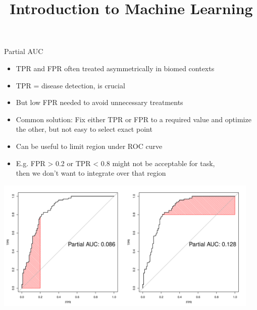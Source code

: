 




\newcommand{\titlefigure}{figure/eval_mclass_roc_sp_13}
\newcommand{\learninggoals}{
\item Understand pAUC 
\item Understand multi-class AUC
}


\title{Introduction to Machine Learning}
\date{}



\sloppy



\begin{vbframe}{Partial AUC}

\begin{itemize}
  \item TPR and FPR often treated asymmetrically in biomed contexts
  \item TPR = disease detection, is crucial
  \item But low FPR needed to avoid unnecessary treatments
\item Common solution: Fix either TPR or FPR to a required value and optimize the other, but not easy to select exact point 
\framebreak
  \item Can be useful to limit region under ROC curve
  \item E.g. FPR > 0.2 or TPR < 0.8 might not be acceptable for task,\\
      then we don't want to integrate over that region
\end{itemize}

\begin{knitrout}\scriptsize
{}\color{fgcolor}
{\centering \includegraphics[width=0.95\textwidth]{figure/eval_mclass_roc_sp_13}}
\end{knitrout}

\end{vbframe}

